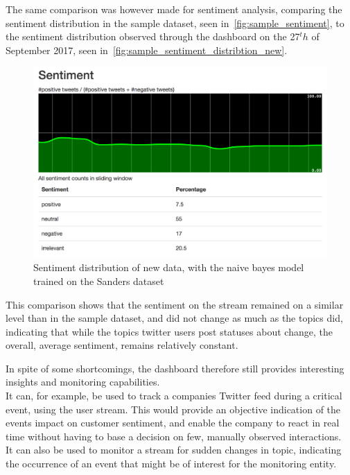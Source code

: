 The same comparison was however made for sentiment analysis, comparing the sentiment distribution in the sample dataset, seen in~\autoref{fig:sample_sentiment},
to the sentiment distribution observed through the dashboard on the 27$^th$ of September 2017, seen in~\autoref{fig:sample_sentiment_distribtion_new}.

\begin{figure}
    \centering
    \caption{Sentiment distribution of new data, with the naive bayes model trained on the Sanders dataset}
    \label{fig:sample_sentiment_distribtion_new}
    \includegraphics[width=\textwidth]{../images/dashboard_sentiment_sample.png}
\end{figure}

This comparison shows that the sentiment on the stream remained on a similar level than in the sample dataset,
and did not change as much as the topics did, indicating that while the topics twitter users post statuses about change,
the overall, average sentiment, remains relatively constant.

In spite of some shortcomings, the dashboard therefore still provides interesting insights and monitoring capabilities.\\
It can, for example, be used to track a companies Twitter feed during a critical event, using the user stream.
This would provide an objective indication of the events impact on customer sentiment,
and enable the company to react in real time without having to base a decision on few, manually observed interactions.\\
It can also be used to monitor a stream for sudden changes in topic,
indicating the occurrence of an event that might be of interest for the monitoring entity.